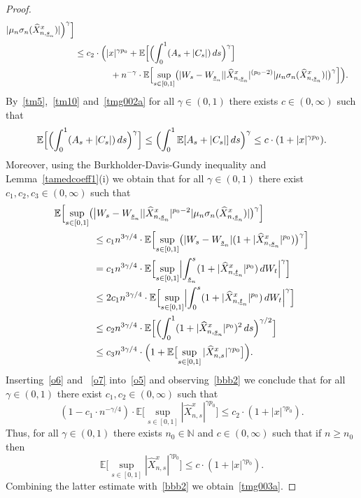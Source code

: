 \documentclass[11pt]{amsart}
\newcommand{\N}{{\mathbb N}}
\newcommand{\EE}{{\mathbb E}}
\newcommand{\usn}{\underline {s}_n}
\newcommand{\utn}{\underline {t}_n}
\theoremstyle{plain}
\theoremstyle{definition}
\begin{document}
\begin{proof}
\begin{equation}
\begin{aligned}
  |\mu_n\sigma_n(\widehat X^x_{n,\usn})|\Bigr)^\gamma\Bigr] \\
 & \le c_2 \cdot \Bigl(|x|^{\gamma p_0} +\EE\Bigl[\Bigl(\int_0^1 (A_s + |C_s|)\, ds\Bigr)^\gamma
\Bigr] \\
 &\qquad\qquad + n^{-\gamma} \cdot \EE\Bigl[\sup_{s\in[0,1]}\bigl(  |W_{s}-W_{\usn}| |\widehat X^x_{n,\usn}|^{(p_0-2)} |\mu_n\sigma_n(\widehat X^x_{n,\usn})|\bigr)^\gamma\Bigr]\Bigr).
\end{aligned}
\end{equation}
By~\eqref{tm5},~\eqref{tm10} and~\eqref{tmg002a} for all $\gamma\in (0,1)$  there exists $c\in(0, \infty)$  such that
\begin{equation}\label{o6}
\EE\Bigl[\Bigl(\int_0^1 (A_s + |C_s|)\, ds\Bigr)^\gamma \Bigr]\le \Bigl(\int_0^1\EE[A_s + |C_s|]\, ds\Bigr)^{\gamma} \le c\cdot (1+|x|^{\gamma p_0}).
\end{equation} Moreover, using  the Burkholder-Davis-Gundy inequality and Lemma~\ref{tamedcoeff1}(i)
we obtain that for all $\gamma\in (0,1)$  there exist $c_1, c_2, c_3\in(0, \infty)$  such that
\begin{equation}\label{o7}
\begin{aligned}
& \EE\Bigl[\sup_{s\in[0,1]}\bigl(\bigl |W_{s}-W_{\usn}||\widehat X^x_{n,\usn}|^{p_0-2} |\mu_n\sigma_n(\widehat X^x_{n,\usn})|\bigr)^\gamma \Bigr] \\
& \qquad \qquad \le c_1 n^{3\gamma/4}\cdot
\EE\Bigl[\sup_{s\in[0,1]} \bigl(  |W_{s}-W_{\usn}|(1+|\widehat X^x_{n,\usn}|^{p_0} )\bigr)^\gamma \Bigr] \\
& \qquad \qquad =c_1 n^{3\gamma/4}  \cdot
\EE\Bigl[\sup_{s\in[0,1]}  \Bigl|  \int_{\usn}^s(1+|\widehat X^x_{n,\utn}|^{p_0} )\, dW_t\Bigr|^\gamma \Bigr]  \\
& \qquad \qquad \le 2c_1 n^{3\gamma/4}  \cdot
\EE\Bigl[\sup_{s\in[0,1]}  \Bigl|  \int_{0}^s(1+|\widehat X^x_{n,\utn}|^{p_0} )\, dW_t\Bigr|^\gamma \Bigr]  \\
& \qquad \qquad \le c_2n^{3\gamma/4}  \cdot
\EE\Bigl[ \Bigl(\int_{0}^1(1+|\widehat X^x_{n,\usn}|^{p_0} )^2\, ds\Bigr)^{\gamma/2} \Bigr]  \\
& \qquad \qquad \le c_3n^{3\gamma/4} \cdot\Bigl( 1 + \EE\bigl[\sup_{s\in[0,1]}|\widehat X^x_{n,s}|^{\gamma p_0}\bigr]\Bigr).
\end{aligned}
\end{equation}
 Inserting~\eqref{o6} and ~\eqref{o7} into~\eqref{o5} and observing~\eqref{bbb2} we conclude that for all $\gamma\in (0,1)$  there exist $c_1, c_2\in(0, \infty)$  such that
\begin{equation}\label{vvv3}
(1-c_1\cdot  n^{-\gamma/4}) \cdot \EE\bigl[\sup_{s\in[0,1]}|\widehat X^x_{n,s}|^{\gamma p_0}\bigr] 	\le c_2\cdot ( 1 + |x|^{\gamma p_0}).
\end{equation}
Thus, for all $\gamma\in (0,1)$  there exists $n_0\in\N$ and  $c\in(0, \infty)$  such that if $n\geq n_0$ then
\[
\EE\bigl[\sup_{s\in[0,1]}|\widehat X^x_{n,s}|^{\gamma p_0}\bigr] 	\le c\cdot ( 1 + |x|^{\gamma p_0}).
\]
Combining the latter estimate with~\eqref{bbb2} we obtain~\eqref{tmg003a}.


\end{proof}
\end{document}
